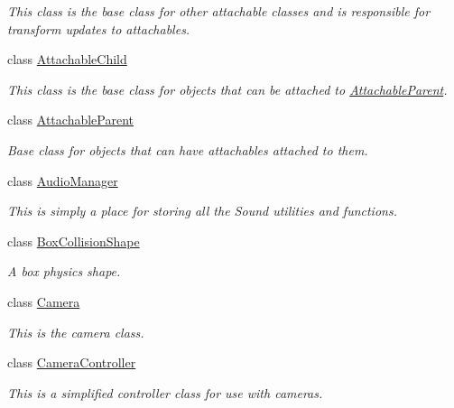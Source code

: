 \begin{DoxyCompactItemize}
\begin{DoxyCompactList}\small\item\em This class is the base class for other attachable classes and is responsible for transform updates to attachables. \item\end{DoxyCompactList}\item 
class \hyperlink{classMezzanine_1_1AttachableChild}{AttachableChild}
\begin{DoxyCompactList}\small\item\em This class is the base class for objects that can be attached to \hyperlink{classMezzanine_1_1AttachableParent}{AttachableParent}. \item\end{DoxyCompactList}\item 
class \hyperlink{classMezzanine_1_1AttachableParent}{AttachableParent}
\begin{DoxyCompactList}\small\item\em Base class for objects that can have attachables attached to them. \item\end{DoxyCompactList}\item 
class \hyperlink{classMezzanine_1_1AudioManager}{AudioManager}
\begin{DoxyCompactList}\small\item\em This is simply a place for storing all the Sound utilities and functions. \item\end{DoxyCompactList}\item 
class \hyperlink{classMezzanine_1_1BoxCollisionShape}{BoxCollisionShape}
\begin{DoxyCompactList}\small\item\em A box physics shape. \item\end{DoxyCompactList}\item 
class \hyperlink{classMezzanine_1_1Camera}{Camera}
\begin{DoxyCompactList}\small\item\em This is the camera class. \item\end{DoxyCompactList}\item 
class \hyperlink{classMezzanine_1_1CameraController}{CameraController}
\begin{DoxyCompactList}\small\item\em This is a simplified controller class for use with cameras. \item\end{DoxyCompactList}\item 

\end{DoxyCompactItemize}
